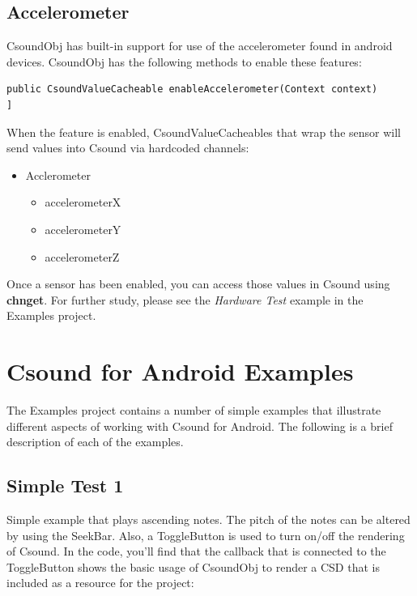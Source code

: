 \documentclass[11pt]{article}
\begin{document}
\subsection{Accelerometer}

CsoundObj has built-in support for use of the accelerometer found in android devices. CsoundObj has the following methods to enable these features:


\begin{lstlisting}[caption=CsoundObj Accelerometer Method]
public CsoundValueCacheable enableAccelerometer(Context context)
]
\end{lstlisting}

When the feature is enabled, CsoundValueCacheables that wrap the sensor will send values into Csound via hardcoded channels:

\begin{itemize}

\item Acclerometer
\begin{itemize}
\item accelerometerX
\item accelerometerY
\item accelerometerZ
\end{itemize}

\end{itemize} 

Once a sensor has been enabled, you can access those values in Csound using \textbf{chnget}. For further study, please see the \emph{Hardware Test} example in the Examples project. 


\section{Csound for Android Examples}

The Examples project contains a number of simple examples that illustrate different aspects of working with Csound for Android.  The following is a brief description of each of the examples.

\subsection{Simple Test 1}

Simple example that plays ascending notes.  The pitch of the notes can be altered by using the SeekBar.  Also, a ToggleButton is used to turn on/off the rendering of Csound.  In the code, you'll find that the callback that is connected to the ToggleButton shows the basic usage of CsoundObj to render a CSD that is included as a resource for the project:
\end{document}
